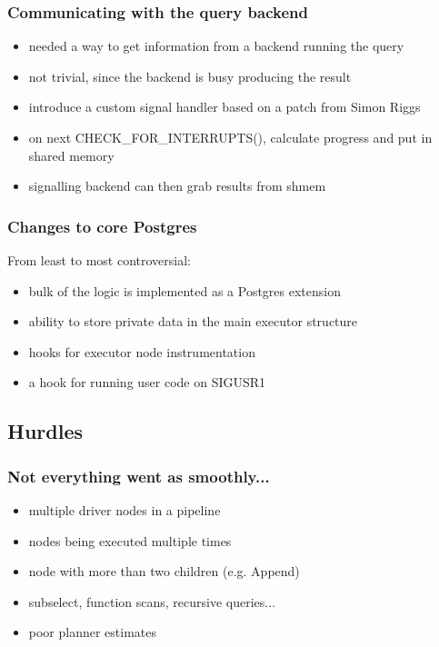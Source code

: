 \documentclass{beamer}
\begin{document}
\begin{frame}
  \frametitle{Communicating with the query backend}

  \begin{itemize}
  \item needed a way to get information from a backend running the query
  \item not trivial, since the backend is busy producing the result
  \item introduce a custom signal handler based on a patch from Simon Riggs
  \item on next CHECK\_FOR\_INTERRUPTS(), calculate progress and put in shared
    memory
  \item signalling backend can then grab results from shmem
  \end{itemize}
\end{frame}

\begin{frame}
  \frametitle{Changes to core Postgres}

  From least to most controversial:

  \begin{itemize}
  \item bulk of the logic is implemented as a Postgres extension
  \item ability to store private data in the main executor structure
  \item hooks for executor node instrumentation
  \item a hook for running user code on SIGUSR1
  \end{itemize}
\end{frame}

\subsection{Hurdles}

\begin{frame}
  \frametitle{Not everything went as smoothly...}

  \begin{itemize}
  \item multiple driver nodes in a pipeline
  \item nodes being executed multiple times
  \item node with more than two children (e.g. Append)
  \item subselect, function scans, recursive queries...
  \item poor planner estimates
  \end{itemize}
\end{frame}
\end{document}

